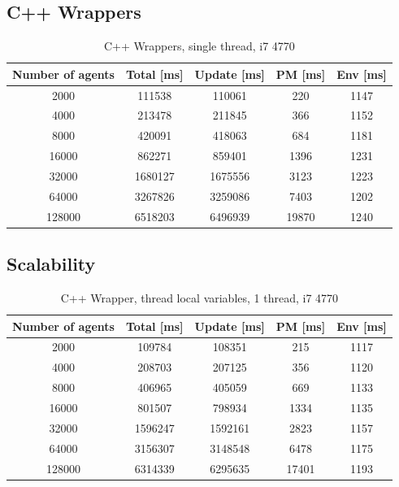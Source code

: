 \documentclass[12pt, a4paper]{report}
\begin{document}
\begin{appendices}
\section{C++ Wrappers}\label{appen-sec:bench-c++-wrap}
\begin{table}[H]
  \begin{center}
    \begin{tabular}{|c||c||c|c|c|}
    \hline
    Number of agents & Total [ms] & Update [ms] & PM [ms] & Env [ms] \\ \hline
    2000             & 111538     & 110061      & 220     & 1147     \\
    4000             & 213478     & 211845      & 366     & 1152     \\
    8000             & 420091     & 418063      & 684     & 1181     \\
    16000            & 862271     & 859401      & 1396    & 1231     \\
    32000            & 1680127    & 1675556     & 3123    & 1223     \\
    64000            & 3267826    & 3259086     & 7403    & 1202     \\
    128000           & 6518203    & 6496939     & 19870   & 1240     \\ \hline
    \end{tabular}
    \caption {C++ Wrappers, single thread, i7 4770}
    \label{table:append-c++-wrap}
  \end{center}
\end{table}

\subsection{Scalability}\label{appen-subsec:bench-c++-wrap-multi}

\begin{table}[H]
  \begin{center}
    \begin{tabular}{|c||c||c|c|c|}
    \hline
    Number of agents & Total [ms] & Update [ms] & PM [ms] & Env [ms] \\ \hline
    2000             & 109784     & 108351      & 215     & 1117     \\
    4000             & 208703     & 207125      & 356     & 1120     \\
    8000             & 406965     & 405059      & 669     & 1133     \\
    16000            & 801507     & 798934      & 1334    & 1135     \\
    32000            & 1596247    & 1592161     & 2823    & 1157     \\
    64000            & 3156307    & 3148548     & 6478    & 1175     \\
    128000           & 6314339    & 6295635     & 17401   & 1193     \\ \hline
    \end{tabular}
    \caption {C++ Wrapper, thread local variables, 1 thread, i7 4770}
    \label{table:append-c++-wrap-1-thread-line}
  \end{center}
\end{table}


\end{appendices}
\end{document}
